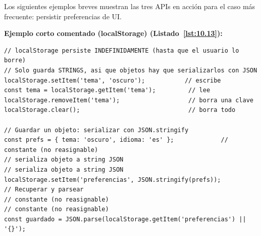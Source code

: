\documentclass[11pt,a4paper,openany]{book}
\begin{document}
Los siguientes ejemplos breves muestran las tres APIs en
acción para el caso más frecuente: persistir preferencias de UI.

\textbf{Ejemplo corto comentado (localStorage) (Listado~\ref{lst:10.13}):}
\begin{lstlisting}[style=js,numbers=none,caption={Ejemplo de JavaScript},label=lst:10.13]
// localStorage persiste INDEFINIDAMENTE (hasta que el usuario lo borre)
// Solo guarda STRINGS, asi que objetos hay que serializarlos con JSON
localStorage.setItem('tema', 'oscuro');           // escribe
const tema = localStorage.getItem('tema');         // lee
localStorage.removeItem('tema');                   // borra una clave
localStorage.clear();                              // borra todo

// Guardar un objeto: serializar con JSON.stringify
const prefs = { tema: 'oscuro', idioma: 'es' };             // constante (no reasignable)
// serializa objeto a string JSON
// serializa objeto a string JSON
localStorage.setItem('preferencias', JSON.stringify(prefs));
// Recuperar y parsear
// constante (no reasignable)
// constante (no reasignable)
const guardado = JSON.parse(localStorage.getItem('preferencias') || '{}');
\end{lstlisting}
\end{document}
